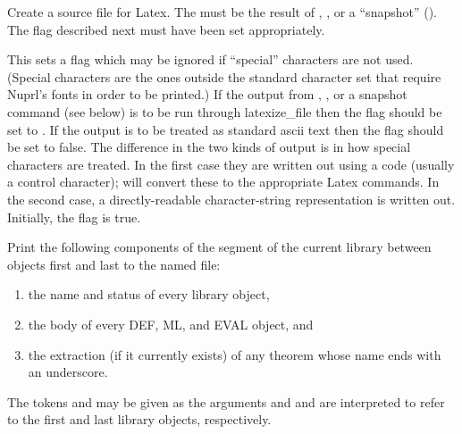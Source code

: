 


 Create
a source file for Latex.  The  must be the result of
, ,  or a ``snapshot'' (\PRINT).  The
flag described next must have been set appropriately.

 This sets a flag
which may be ignored if ``special'' characters are not used.  (Special
characters are the ones outside the standard character set that require
Nuprl's fonts in order to be printed.)  If the output from ,
,  or a snapshot command (see below) is to be
run through latexize\_file then the flag should be set to .  If
the output is to be treated as standard ascii text then the flag should be
set to false.  The difference in the two kinds of output is in how special
characters are treated.  In the first case they are written out using a
code (usually a control character);  will convert these to
the appropriate Latex commands.  In the second case, a directly-readable
character-string representation is written out.  Initially, the flag is
true.

Print the
following components of the segment of the current library between
objects first and last to the named file:
\begin{enumerate}
\item the name and status of
every library object,
\item the body of every DEF, ML, and EVAL object, and
\item the extraction (if it currently exists) of any theorem whose name
ends with an underscore.  
\end{enumerate} 
The tokens  and  may be given as
the arguments  and  and are interpreted to refer to
the first and last library objects, respectively.


